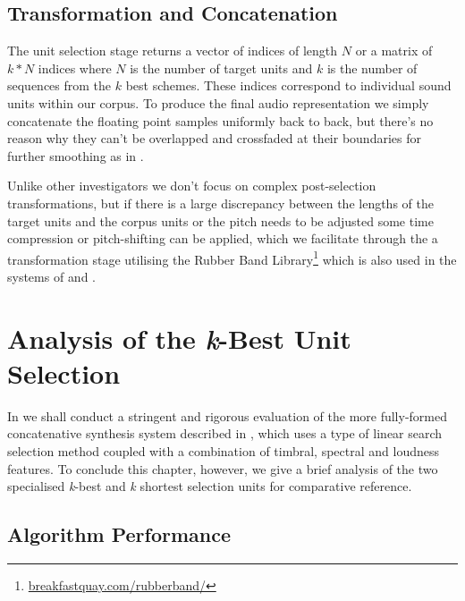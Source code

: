 {{{{{{{{\subsection{Transformation and Concatenation}

The unit selection stage returns a vector of indices of length $N$ or a matrix of $k*N$ indices  where $N$ is the number of target units and $k$ is the number of sequences from the $k$ best schemes. These indices correspond to individual sound units within our corpus. To produce the final audio representation we simply concatenate the floating point samples uniformly back to back, but there’s no reason why they can’t be overlapped and crossfaded at their boundaries for further smoothing as in \citep{Schwarz2006b}. 

Unlike other investigators we don't focus on complex post-selection transformations, but if there is a large discrepancy between the lengths of the target units and the corpus units or the pitch needs to be adjusted some time compression or pitch-shifting can be applied, which we facilitate through the a transformation stage utilising the Rubber Band Library\footnote{\url{breakfastquay.com/rubberband/}} which is also used in the systems of \cite{Davies2013} and \cite{Smith2015}.

\section{Analysis of the \textit{k}-Best Unit Selection}

In  we shall conduct a stringent and rigorous evaluation of the more fully-formed concatenative synthesis system described in , which uses a type of linear search selection method coupled with a combination of timbral, spectral and loudness features. To conclude this chapter, however, we give a brief analysis of the two specialised \textit{k}-best and \textit{k} shortest selection units for comparative reference.

\subsection{Algorithm Performance}

}}}}}}}}
